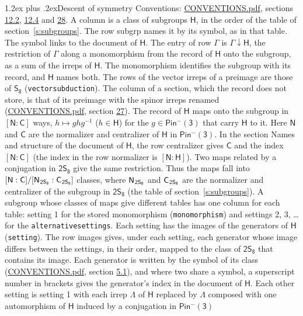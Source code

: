\documentclass[10pt,a4paper]{article}
\makeatletter
\renewcommand\section{\@startsection{section}{1}{\z@}{-3ex plus -1ex minus -.2ex}%
  {1.2ex plus .2ex}{\normalfont\large\sffamily\bfseries\color{parttitle}}}
\numberwithin{equation}{section}
\newcommand{\grp}[1]{\mathsf{#1}}
\newcommand{\grpindex}[2]{[#1 : #2]}
\newcommand{\restr}[2]{#1\!\downarrow#2}
\newcommand{\hairsp}{\mkern1mu}
\makeatother
\begin{document}
\section{Descent of symmetry}\label{s:subduction}
Conventions: \href{../../CONVENTIONS.pdf}{CONVENTIONS.pdf}, sections \href{../../../rotation/CONVENTIONS.pdf\#conv.12.2}{12.2}, \href{../../../rotation/CONVENTIONS.pdf\#conv.12.4}{12.4} and \href{../../CONVENTIONS.pdf\#conv.28}{28}.
A column is a class of subgroups $\grp{H}$, in the order of the table of section~\ref{s:subgroups}. The row subgrp names it by its symbol, as in that table. The symbol links to the document of $\grp{H}$. The entry of row $\Gamma$ is $\restr{\Gamma}{\grp{H}}$, the restriction of $\Gamma$ along a monomorphism from the record of $\grp{H}$ onto the subgroup, as a sum of the irreps of $\grp{H}$. The monomorphism identifies the subgroup with its record, and $\grp{H}$ names both. The rows of the vector irreps of a preimage are those of \href{../../../rotation/data/pdf/S8.pdf}{$\grp{S_{8}}$} (\texttt{vectorsubduction}). The column of a section, which the record does not store, is that of its preimage with the spinor irreps renamed (\href{../../CONVENTIONS.pdf}{CONVENTIONS.pdf}, section \href{../../CONVENTIONS.pdf\#conv.27}{27}). \label{n:group.normalizer.o3}\label{n:group.centralizer.o3}\label{n:element.h}The record of $\grp{H}$ maps onto the subgroup in $\grpindex{\grp{N}}{\grp{C}}$ ways, $h \mapsto g h g^{-1}$ ($h \in \grp{H}$) for the $g \in \grp{Pin^{-}(3)}$ that carry $\grp{H}$ to it. Here $\grp{N}$ and $\grp{C}$ are the normalizer and centralizer of $\grp{H}$ in \href{Pinminus3.pdf}{$\grp{Pin^{-}(3)}$}. In the section Names and structure of the document of $\grp{H}$, the row centralizer gives $\grp{C}$ and the index $\grpindex{\grp{N}}{\grp{C}}$ (the index in the row normalizer is $\grpindex{\grp{N}}{\grp{H}}$). Two maps related by a conjugation in $\grp{2S_{8}}$ give the same restriction. Thus the maps fall into $\grpindex{\grp{N}}{\grp{C}}/\grpindex{\grp{N}_{\hairsp \grp{2S_{8}}}}{\grp{C}_{\hairsp \grp{2S_{8}}}}$ classes, where $\grp{N}_{\hairsp \grp{2S_{8}}}$ and $\grp{C}_{\hairsp \grp{2S_{8}}}$ are the normalizer and centralizer of the subgroup in $\grp{2S_{8}}$ (the table of section~\ref{s:subgroups}). \label{n:head.setting}A subgroup whose classes of maps give different tables has one column for each table: setting 1 for the stored monomorphism (\texttt{monomorphism}) and settings 2, 3, \dots{} for the \texttt{alternativesettings}. Each setting has the images of the generators of $\grp{H}$ (\texttt{setting}). \label{n:head.images}The row images gives, under each setting, each generator whose image differs between the settings, in their order, mapped to the class of $\grp{2S_{8}}$ that contains its image. Each generator is written by the symbol of its class (\href{../../CONVENTIONS.pdf}{CONVENTIONS.pdf}, section \href{../../../rotation/CONVENTIONS.pdf\#conv.5.1}{5.1}), and where two share a symbol, a superscript number in brackets gives the generator's index in the document of $\grp{H}$. \label{n:irrep.Delta}Each other setting is setting 1 with each irrep $\Lambda$ of $\grp{H}$ replaced by $\Lambda$ composed with one automorphism of $\grp{H}$ induced by a conjugation in \href{Pinminus3.pdf}{$\grp{Pin^{-}(3)}$} 
\end{document}
